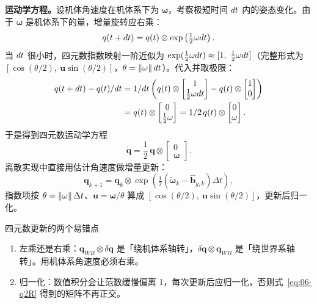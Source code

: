 \textbf{运动学方程。}设机体角速度在机体系下为 $\bm{\omega}$，考察极短时间 $d t$ 内的姿态变化。由于 $\bm{\omega}$ 是机体系下的量，增量旋转应右乘：
\begin{equation}
  q(t+d t) = q(t)\otimes\exp\left(\tfrac{1}{2}\omega d t\right).
\end{equation}
当 $d t$ 很小时，四元数指数映射一阶近似为 $\exp(\tfrac{1}{2}\bm{\omega}\diff t)\approx[1,\ \tfrac{1}{2}\bm{\omega}\diff t]$（完整形式为 $[\cos(\theta/2),\ \bm{u}\sin(\theta/2)]$，$\theta=\left\lVert \omega \right\rVert d t$）。代入并取极限：
\begin{align}
  q(t+d t)-q(t)/d t
  &= 1/d t\left(q(t)\otimes\begin{bmatrix}1\\ \tfrac{1}{2}\omega d t\end{bmatrix}
     - q(t)\otimes\begin{bmatrix}1\\ 0\end{bmatrix}\right) \notag\\
  &= q(t)\otimes\begin{bmatrix}0\\ \tfrac{1}{2}\omega\end{bmatrix}
  = 1/2\,q(t)\otimes\begin{bmatrix}0\\ \omega\end{bmatrix}.
\end{align}
于是得到四元数运动学方程
\begin{equation}
  \dot{\bm{q}} = \frac{1}{2}\,\bm{q}\otimes\begin{bmatrix}0\\ \bm{\omega}\end{bmatrix}.
  \label{eq:06-qdot}
\end{equation}
离散实现中直接用估计角速度做增量更新：
\begin{equation}
  \bm{q}_{k+1} = \bm{q}_k\otimes\exp\left(\tfrac{1}{2}\left(\tilde{\bm{\omega}}_k-\hat{\bm{b}}_{g,k}\right)\Delta t\right),
  \label{eq:06-q-update}
\end{equation}
指数项按 $\theta=\left\lVert \omega \right\rVert\Delta t$、$\bm{u}=\bm{\omega}/\theta$ 算成 $[\cos(\theta/2),\ \bm{u}\sin(\theta/2)]$，更新后归一化。

\begin{keybox}{四元数更新的两个易错点}
\begin{enumerate}
  \item 左乘还是右乘：$\bm{q}_{WB}\otimes\delta\bm{q}$ 是「绕机体系轴转」，$\delta\bm{q}\otimes\bm{q}_{WB}$ 是「绕世界系轴转」。用机体系角速度必须右乘。
  \item 归一化：数值积分会让范数缓慢偏离 1，每次更新后应归一化，否则式~\eqref{eq:06-q2R} 得到的矩阵不再正交。
\end{enumerate}
\end{keybox}

